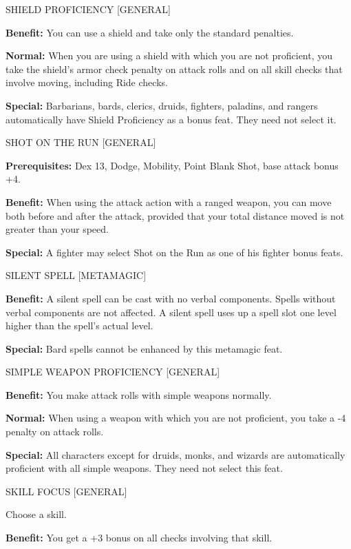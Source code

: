 \documentclass{article}
\begin{document}
\vspace{12pt}
SHIELD PROFICIENCY [GENERAL]

\textbf{Benefit:} You can use a shield and take only the standard penalties.

\textbf{Normal:} When you are using a shield with which you are not proficient, 
you take the shield's armor check penalty on attack rolls and on all skill checks 
that involve moving, including Ride checks.

\textbf{Special:} Barbarians, bards, clerics, druids, fighters, paladins, and rangers 
automatically have Shield Proficiency as a bonus feat. They need not select it.

\vspace{12pt}
SHOT ON THE RUN [GENERAL]

\textbf{Prerequisites:} Dex 13, Dodge, Mobility, Point Blank Shot, base attack 
bonus +4.

\textbf{Benefit:} When using the attack action with a ranged weapon, you can move 
both before and after the attack, provided that your total distance moved is not 
greater than your speed.

\textbf{Special:} A fighter may select Shot on the Run as one of his fighter bonus 
feats.

\vspace{12pt}
SILENT SPELL [METAMAGIC]

\textbf{Benefit:} A silent spell can be cast with no verbal components. Spells 
without verbal components are not affected. A silent spell uses up a spell slot 
one level higher than the spell's actual level.

\textbf{Special:} Bard spells cannot be enhanced by this metamagic feat.

\vspace{12pt}
SIMPLE WEAPON PROFICIENCY [GENERAL]

\textbf{Benefit:} You make attack rolls with simple weapons normally.

\textbf{Normal:} When using a weapon with which you are not proficient, you take 
a -4 penalty on attack rolls.

\textbf{Special:} All characters except for druids, monks, and wizards are automatically 
proficient with all simple weapons. They need not select this feat.

\vspace{12pt}
SKILL FOCUS [GENERAL]

Choose a skill.

\textbf{Benefit:} You get a +3 bonus on all checks involving that skill.
\end{document}
